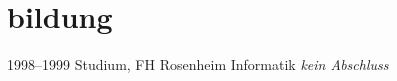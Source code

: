 \documentclass[]{friggeri-cv-a4}
\begin{document}
\section{bildung}
\begin{entrylist}
\entry
{1998--1999}
{Studium, FH Rosenheim}
{Informatik}
{\textit{kein Abschluss}}
\end{entrylist}





\end{document}
